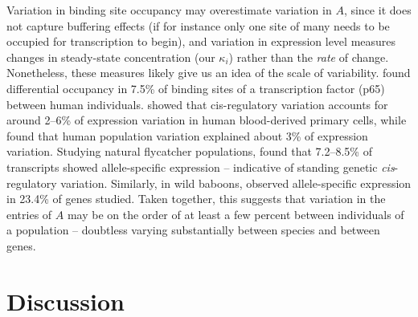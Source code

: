 \documentclass{article}
\newcommand{\1}{\mathbbm{1}}
\begin{document}
Variation in binding site occupancy may overestimate variation in $A$,
since it does not capture buffering effects (if for instance only one site of many needs to be occupied for transcription to begin),
and variation in expression level measures changes in steady-state concentration (our $\kappa_i$) rather than the \emph{rate} of change.
Nonetheless, these measures likely give us an idea of the scale of variability.
\citet{kasowski2010variation} found differential occupancy in 7.5\%
of binding sites of a transcription factor (p65) between human individuals.
\citet{verlaan2009targeted} showed that cis-regulatory variation
accounts for around 2--6\% of expression variation in human blood-derived primary cells,
while \citet{lappalainen2013transcriptome} found that human population variation 
explained about 3\% of expression variation.
Studying natural flycatcher populations, \citet{wang2017bayesian} found that 7.2--8.5\% of transcripts showed allele-specific expression -- indicative of standing genetic \emph{cis}-regulatory variation. Similarly, in wild baboons, \citet{tung2015genetic} observed allele-specific expression in 23.4\% of genes studied. 
Taken together, this suggests that variation in the entries of $A$
may be on the order of at least a few percent between individuals of a population --
doubtless varying substantially between species and between genes.

\section*{Discussion}

\end{document}
